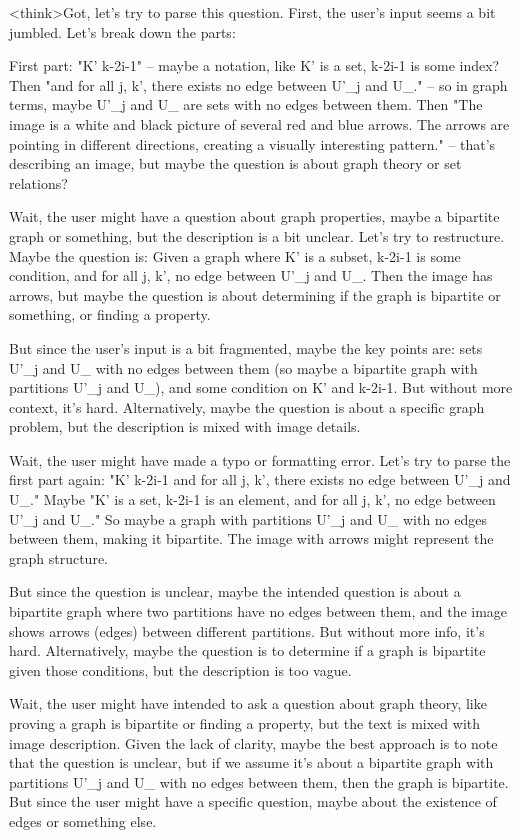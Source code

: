<think>Got, let's try to parse this question. First, the user's input seems a bit jumbled. Let's break down the parts:

First part: "K' k-2i-1" – maybe a notation, like K' is a set, k-2i-1 is some index? Then "and for all j, k', there exists no edge between U'_j and U_." – so in graph terms, maybe U'_j and U_ are sets with no edges between them. Then "The image is a white and black picture of several red and blue arrows. The arrows are pointing in different directions, creating a visually interesting pattern." – that's describing an image, but maybe the question is about graph theory or set relations?

Wait, the user might have a question about graph properties, maybe a bipartite graph or something, but the description is a bit unclear. Let's try to restructure. Maybe the question is: Given a graph where K' is a subset, k-2i-1 is some condition, and for all j, k', no edge between U'_j and U_. Then the image has arrows, but maybe the question is about determining if the graph is bipartite or something, or finding a property.

But since the user's input is a bit fragmented, maybe the key points are: sets U'_j and U_ with no edges between them (so maybe a bipartite graph with partitions U'_j and U_), and some condition on K' and k-2i-1. But without more context, it's hard. Alternatively, maybe the question is about a specific graph problem, but the description is mixed with image details.

Wait, the user might have made a typo or formatting error. Let's try to parse the first part again: "K' k-2i-1 and for all j, k', there exists no edge between U'_j and U_." Maybe "K' is a set, k-2i-1 is an element, and for all j, k', no edge between U'_j and U_." So maybe a graph with partitions U'_j and U_ with no edges between them, making it bipartite. The image with arrows might represent the graph structure.

But since the question is unclear, maybe the intended question is about a bipartite graph where two partitions have no edges between them, and the image shows arrows (edges) between different partitions. But without more info, it's hard. Alternatively, maybe the question is to determine if a graph is bipartite given those conditions, but the description is too vague.

Wait, the user might have intended to ask a question about graph theory, like proving a graph is bipartite or finding a property, but the text is mixed with image description. Given the lack of clarity, maybe the best approach is to note that the question is unclear, but if we assume it's about a bipartite graph with partitions U'_j and U_ with no edges between them, then the graph is bipartite. But since the user might have a specific question, maybe about the existence of edges or something else.

